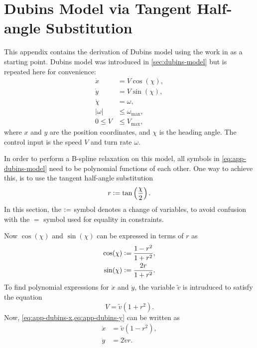 \chapter{Dubins Model via Tangent Half-angle Substitution}\label{app:tangent-half-angle}

This appendix contains the derivation of Dubins model using the work in \citet{mercy2017spline} as a starting point. 
Dubins model was introduced in \cref{sec:dubins-model} but is repeated here for convenience:
\begin{subequations}\label{eq:app-dubins-model}
    \begin{align}
        \dot x &= V \cos(\chi),       \label{eq:app-dubins-x} \\
        \dot y &= V \sin(\chi),       \label{eq:app-dubins-y} \\
        \dot \chi &= \omega,          \label{eq:app-dubins-chi} \\
        |\omega| &\leq \omega_{\max}, \label{eq:app-dubins-omega} \\
        0 \leq V &\leq V_{\max},      \label{eq:app-dubins-V} 
    \end{align}
\end{subequations}
where $x$ and $y$ are the position coordinates, and $\chi$ is the heading angle. The control input is the speed $V$ and turn rate $\omega$.

In order to perform a B-spline relaxation on this model, all symbols in \cref{eq:app-dubins-model} need to be polynomial functions of each other. One way to  achieve this, is to use the tangent half-angle substitution
\begin{equation}\label{eq:tangent-half-angle}
    r \vcentcolon= \tan\left(\frac{\chi}{2}\right).
\end{equation}
In this section, the $\vcentcolon=$ symbol denotes a change of variables, to avoid confusion with the $=$ symbol used for equality in constraints. 

Now $\cos(\chi)$ and $\sin(\chi)$ can be expressed in terms of $r$ as
\begin{subequations}\label{eq:cos-sin-r}
    \begin{align}
        \cos(\chi) &\vcentcolon= \frac{1 - r^2}{1 + r^2}, \label{eq:cos-r} \\
        \sin(\chi) &\vcentcolon= \frac{2r}{1 + r^2}.      \label{eq:sin-r}
    \end{align}
\end{subequations}
To find polynomial expressions for $\dot x$ and $\dot y$, the variable $\tilde v$ is intruduced to satisfy the equation
\begin{equation}\label{eq:constraint-V}
    V = \tilde v (1 + r^2).
\end{equation}
Now, \cref{eq:app-dubins-x,eq:app-dubins-y} can be written as
\begin{subequations}\label{eq:app-dubins-xy}
    \begin{align}
        \dot x &= \tilde v (1 - r^2), \label{eq:app-dubins-x-r} \\
        \dot y &= 2\tilde v r.        \label{eq:app-dubins-y-r}
    \end{align}
\end{subequations}

